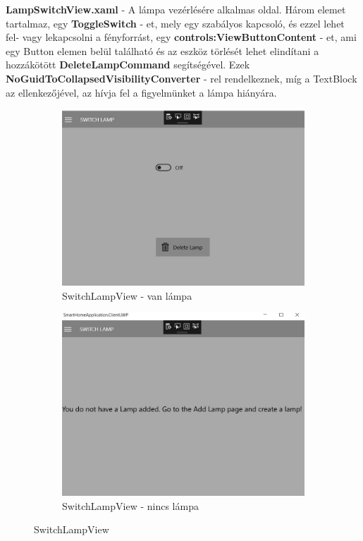 \documentclass[a4paper,12pt]{report}
\begin{document}
    \textbf{LampSwitchView.xaml} - A lámpa vezérlésére alkalmas oldal. Három elemet tartalmaz, egy \textbf{ToggleSwitch} - et, mely
    egy szabályos kapcsoló, és ezzel lehet fel- vagy lekapcsolni a fényforrást, egy \textbf{controls:ViewButtonContent} - et, ami egy
    Button elemen belül található és az eszköz törlését lehet elindítani a hozzákötött \textbf{DeleteLampCommand} segítségével. Ezek
    \textbf{NoGuidToCollapsedVisibilityConverter} - rel rendelkeznek, míg a TextBlock az ellenkezőjével, az hívja fel a figyelmünket
    a lámpa hiányára.

    \begin{figure}[H]
        \centering
        \begin{subfigure}[b]{0.4\linewidth}
            \includegraphics[width=\linewidth]{images/switchview.jpg}
            \caption{SwitchLampView - van lámpa}
        \end{subfigure}
        \begin{subfigure}[b]{0.4\linewidth}
            \includegraphics[width=\linewidth]{images/switchdonthavelamp.jpg}
            \caption{SwitchLampView - nincs lámpa}
        \end{subfigure}
        \caption{SwitchLampView}
        \label{fig:SwitchLamp}
    \end{figure}
\end{document}
